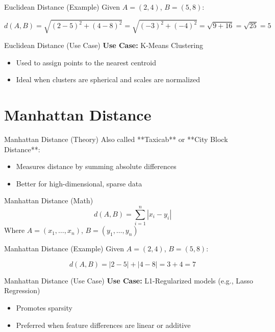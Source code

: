 \documentclass{beamer}
\begin{document}
\begin{frame}{Euclidean Distance (Example)}
Given \( A = (2, 4) \), \( B = (5, 8) \):

\[
d(A, B) = \sqrt{(2 - 5)^2 + (4 - 8)^2}
= \sqrt{(-3)^2 + (-4)^2} = \sqrt{9 + 16} = \sqrt{25} = 5
\]
\end{frame}

\begin{frame}{Euclidean Distance (Use Case)}
\textbf{Use Case:} K-Means Clustering
\begin{itemize}
    \item Used to assign points to the nearest centroid
    \item Ideal when clusters are spherical and scales are normalized
\end{itemize}
\end{frame}

\section{Manhattan Distance}
\begin{frame}{Manhattan Distance (Theory)}
Also called **Taxicab** or **City Block Distance**:
\begin{itemize}
    \item Measures distance by summing absolute differences
    \item Better for high-dimensional, sparse data
\end{itemize}
\end{frame}

\begin{frame}{Manhattan Distance (Math)}
\[
d(A, B) = \sum_{i=1}^{n} |x_i - y_i|
\]
Where \( A = (x_1, \dots, x_n) \), \( B = (y_1, \dots, y_n) \)
\end{frame}
\begin{frame}{Manhattan Distance (Example)}
Given \( A = (2, 4) \), \( B = (5, 8) \):

\[
d(A, B) = |2 - 5| + |4 - 8| = 3 + 4 = 7
\]
\end{frame}

\begin{frame}{Manhattan Distance (Use Case)}
\textbf{Use Case:} L1-Regularized models (e.g., Lasso Regression)
\begin{itemize}
    \item Promotes sparsity
    \item Preferred when feature differences are linear or additive
\end{itemize}
\end{frame}
\end{document}
